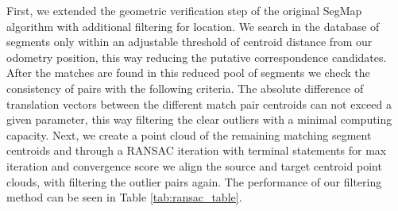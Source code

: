 \documentclass[letterpaper, 10 pt, conference]{ieeeconf}  %
\begin{document}
First, we extended the geometric verification step of the original SegMap algorithm with additional filtering for location. We search in the database of segments only within an adjustable threshold of centroid distance from our odometry position, this way reducing the putative correspondence candidates. After the matches are found in this reduced pool of segments we check the consistency of pairs with the following criteria. The absolute difference of translation vectors between the different match pair centroids can not exceed a given parameter, this way filtering the clear outliers with a minimal computing capacity. Next, we create a point cloud of the remaining matching segment centroids and through a RANSAC iteration with terminal statements for max iteration and convergence score we align the source and target centroid point clouds, with filtering the outlier pairs again. The performance of our filtering method can be seen in Table \ref{tab:ransac_table}. 
\end{document}
